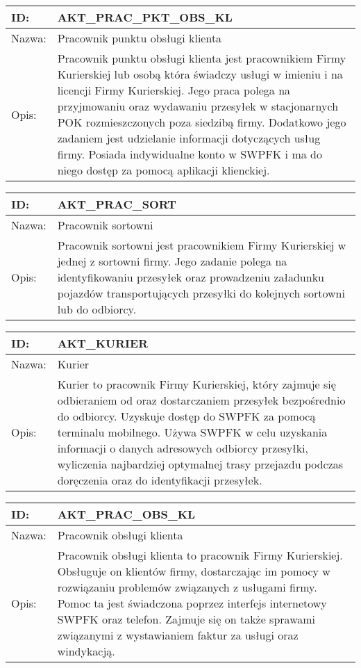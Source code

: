 \begin{center}
\begin{tabular}[h]{|p{1.6cm}|p{13.5cm}|}
\hline
ID: & AKT\_PRAC\_PKT\_OBS\_KL \\ \hline
Nazwa: & Pracownik punktu obsługi klienta \\ \hline
Opis: & Pracownik punktu obsługi klienta jest pracownikiem Firmy Kurierskiej lub osobą która świadczy usługi w imieniu i na licencji Firmy Kurierskiej. Jego praca polega na przyjmowaniu oraz wydawaniu przesyłek w stacjonarnych POK rozmieszczonych poza siedzibą firmy. Dodatkowo jego zadaniem jest udzielanie informacji dotyczących usług firmy. Posiada indywidualne konto w SWPFK i ma do niego dostęp za pomocą aplikacji klienckiej. \\
\hline
\end{tabular}
\end{center}

\begin{center}
\begin{tabular}[h]{|p{1.6cm}|p{13.5cm}|}
\hline
ID: & AKT\_PRAC\_SORT \\ \hline
Nazwa: & Pracownik sortowni \\ \hline
Opis: & Pracownik sortowni jest pracownikiem Firmy Kurierskiej w jednej z sortowni firmy. Jego zadanie polega na identyfikowaniu przesyłek oraz prowadzeniu załadunku pojazdów transportujących przesyłki do kolejnych sortowni lub do odbiorcy. \\
\hline
\end{tabular}
\end{center}

\begin{center}
\begin{tabular}[h]{|p{1.6cm}|p{13.5cm}|}
\hline
ID: & AKT\_KURIER \\ \hline
Nazwa: & Kurier \\ \hline
Opis: & Kurier to pracownik Firmy Kurierskiej, który zajmuje się odbieraniem od oraz dostarczaniem przesyłek bezpośrednio do odbiorcy. Uzyskuje dostęp do SWPFK za pomocą terminalu mobilnego. Używa SWPFK w celu uzyskania informacji o danych adresowych odbiorcy przesyłki, wyliczenia najbardziej optymalnej trasy przejazdu podczas doręczenia oraz do identyfikacji przesyłek. \\
\hline
\end{tabular}
\end{center}

\begin{center}
\begin{tabular}[h]{|p{1.6cm}|p{13.5cm}|}
\hline
ID: & AKT\_PRAC\_OBS\_KL \\ \hline
Nazwa: & Pracownik obsługi klienta \\ \hline
Opis: & Pracownik obsługi klienta to pracownik Firmy Kurierskiej. Obsługuje on klientów firmy, dostarczając im pomocy w rozwiązaniu problemów związanych z usługami firmy. Pomoc ta jest świadczona poprzez interfejs internetowy SWPFK oraz telefon. Zajmuje się on także sprawami związanymi z wystawianiem faktur za usługi oraz windykacją. \\
\hline
\end{tabular}
\end{center}

